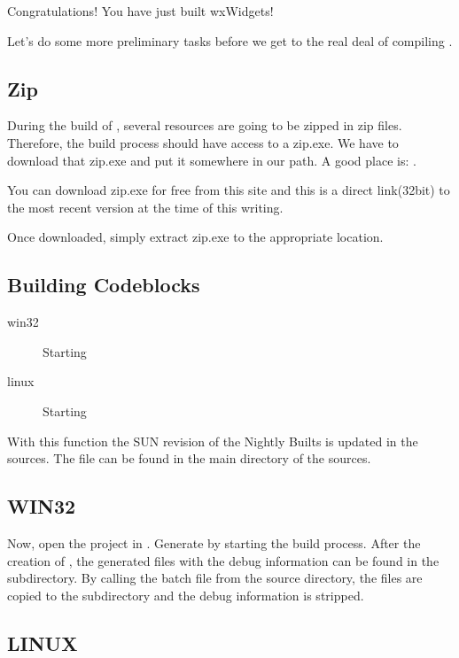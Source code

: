 Congratulations! You have just built wxWidgets!

Let's do some more preliminary tasks before we get to the real deal of compiling \codeblocks.

\subsection{Zip}

During the build of \codeblocks, several resources are going to be zipped in zip files. Therefore, the build process should have access to a zip.exe. We have to download that zip.exe and put it somewhere in our path. A good place is: .

You can download zip.exe for free from this site and this is a direct link(32bit) to the most recent version at the time of this writing.

Once downloaded, simply extract zip.exe to the appropriate location.

\subsection{Building Codeblocks}

\begin{description}
\item[win32] Starting 
\item[linux] Starting 
\end{description}

With this function the SUN revision of the Nightly Builts is updated in the sources. The file can be found in the main directory of the \codeblocks sources.

\subsection{WIN32}

Now, open the project  in \codeblocks. Generate \codeblocks by starting the build process. After the creation of \codeblocks, the generated files with the debug information can be found in the  subdirectory. By calling the batch file  from the source directory, the files are copied to the  subdirectory and the debug information is stripped.

\subsection{LINUX}

